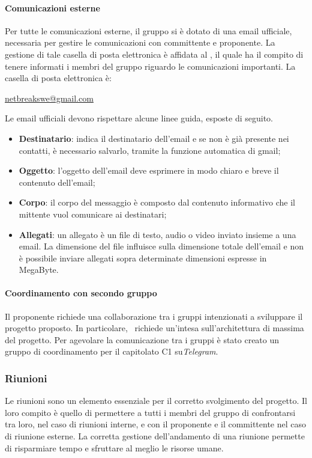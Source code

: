 			\paragraph{Comunicazioni esterne}
			Per tutte le comunicazioni esterne, il gruppo \textit{\gruppo} si è dotato di una email ufficiale, necessaria per gestire le comunicazioni con committente e proponente. La gestione di tale casella di posta elettronica è affidata al \textit{\RdP}, il quale ha il compito di tenere informati i membri del gruppo riguardo le comunicazioni importanti. La casella di posta elettronica è:
			\begin{center}
				\url{netbreakswe@gmail.com} 
			\end{center}
		Le email ufficiali devono rispettare alcune linee guida, esposte di seguito.
		\begin{itemize}
			\item \textbf{Destinatario}: indica il destinatario dell'email e se non è già presente nei contatti, è necessario salvarlo, tramite la funzione automatica di gmail;
			\item \textbf{Oggetto}: l'oggetto dell'email deve esprimere in modo chiaro e breve il contenuto dell'email;
			\item \textbf{Corpo}: il corpo del messaggio è composto dal contenuto informativo che il mittente vuol comunicare ai destinatari;
			\item \textbf{Allegati}: un allegato è un file di testo, audio o video inviato insieme a una email. La dimensione del file influisce sulla dimensione totale dell'email e non è possibile inviare allegati sopra determinate dimensioni espresse in MegaByte.
		\end{itemize}
		\paragraph{Coordinamento con secondo gruppo}
			Il proponente richiede una collaborazione tra i gruppi intenzionati a sviluppare il progetto proposto. In particolare, \proponente\ richiede un'intesa sull'architettura di massima del progetto. Per agevolare la comunicazione tra i gruppi è stato creato un gruppo di coordinamento per il capitolato C1 su\textit{Telegram}.
			
		\subsubsection{Riunioni}
		Le riunioni sono un elemento essenziale per il corretto svolgimento del progetto. Il loro compito è quello di permettere a tutti i membri del gruppo di confrontarsi tra loro, nel caso di riunioni interne, e con il proponente e il committente nel caso di riunione esterne. La corretta gestione dell'andamento di una riunione permette di risparmiare tempo e sfruttare al meglio le risorse umane.
		

